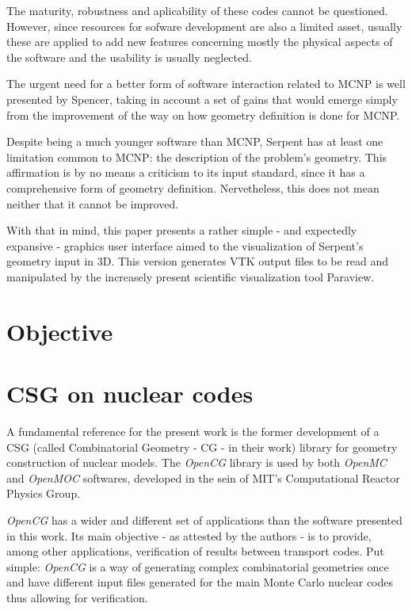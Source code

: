 \documentclass{elsarticle}
\begin{document}
The maturity, robustness and aplicability of these codes cannot be questioned.
However, since resources for sofware development are also a limited asset,
usually these are applied to add new features concerning mostly the physical aspects of the software and the usability is usually neglected.

The urgent need for a better form of software interaction related to MCNP
is well presented by Spencer\cite{Spencer2017}, taking in account a set of gains that would emerge simply from the improvement of the way on how geometry definition is done for MCNP.

Despite being a much younger software than MCNP, Serpent has at least one limitation common to MCNP: the description of the problem's geometry. This affirmation is by no means a criticism to its input standard, since it has a comprehensive form of geometry
definition. Nervetheless, this does not mean neither that it cannot be improved.

With that in mind, this paper presents a rather simple - and expectedly expansive -
graphics user interface aimed to the visualization of Serpent's geometry input
in 3D. This version generates VTK output files to be read and manipulated by
the increasely present scientific visualization tool Paraview\cite{paraview}.

\section{Objective}


\section{CSG on nuclear codes}

A fundamental reference for the present work is the former development of a CSG
(called Combinatorial Geometry - CG - in their work) library for geometry construction
of nuclear models. The \textit{OpenCG} library \cite{Boyd2015} is used by both
\textit{OpenMC} \cite{Romano2015} and \textit{OpenMOC} \cite{Boyd2014} softwares, developed in the sein
of MIT's Computational Reactor Physics Group.

\textit{OpenCG} has a wider and different set of applications than the
software presented in this work. Its main objective - as attested by the authors -
is to provide, among other applications, verification of results between transport
codes. Put simple: \textit{OpenCG} is a way of generating complex
combinatorial geometries once and have different input files generated for the main
Monte Carlo nuclear codes thus allowing for verification.
\end{document}
